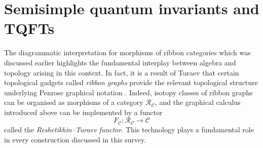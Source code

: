 \documentclass[a4paper,reqno]{amsart}
\theoremstyle{definition}
\theoremstyle{remark}
\newcommand{\calC}{\mathcal{C}}
\newcommand{\calR}{\mathcal{R}}
\begin{document}
\section{Semisimple quantum invariants and TQFTs}\label{S:TQFT_sem-sim}

The diagrammatic interpretation for morphisms of ribbon categories which was discussed earlier highlights the fundamental interplay between algebra and topology arising in this context. In fact, it is a result of Turaev that certain topological gadgets called \textit{ribbon graphs} provide the relevant topological structure underlying Penrose graphical notation \cite[Thm.~I.2.5]{T94}. Indeed, isotopy classes of ribbon graphs can be organised as morphisms of a category $\calR_\calC$, and the graphical calculus introduced above can be implemented by a functor
\[
 F_\calC : \calR_\calC \to \calC
\]
called the \textit{Reshetikhin--Turaev functor}. This technology plays a fundamental role in every construction discussed in this survey.
\end{document}
